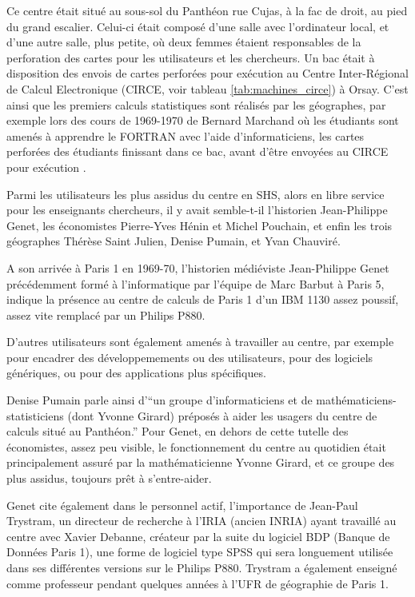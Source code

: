 Ce centre était situé au sous-sol du Panthéon rue Cujas, à la fac de droit, au pied du grand escalier. Celui-ci était composé d'une salle avec l'ordinateur local, et d'une autre salle, plus petite, où deux femmes étaient responsables de la perforation des cartes pour les utilisateurs et les chercheurs. Un bac était à disposition des envois de cartes perforées pour exécution au Centre Inter-Régional de Calcul Electronique (CIRCE, voir tableau \ref{tab:machines_circe}) à Orsay. C'est ainsi que les premiers calculs statistiques sont réalisés par les géographes, par exemple lors des cours de 1969-1970 de Bernard Marchand où les étudiants sont amenés à apprendre le FORTRAN avec l'aide d'informaticiens, les cartes perforées des étudiants finissant dans ce bac, avant d'être envoyées au CIRCE pour exécution \autocite[127]{Cuyala2014}.

Parmi les utilisateurs les plus assidus du centre en SHS, alors en libre service pour les enseignants chercheurs, il y avait semble-t-il l'historien Jean-Philippe Genet, les économistes Pierre-Yves Hénin et Michel Pouchain, et enfin les trois géographes Thérèse Saint Julien, Denise Pumain, et Yvan Chauviré.

A son arrivée à Paris 1 en 1969-70, l'historien médiéviste Jean-Philippe Genet précédemment formé à l'informatique par l'équipe de Marc Barbut à Paris 5, indique la présence au centre de calculs de Paris 1 d'un IBM 1130 assez poussif, assez vite remplacé par un Philips P880.

D'autres utilisateurs sont également amenés à travailler au centre, par exemple pour encadrer des développemements ou des utilisateurs, pour des logiciels génériques, ou pour des applications plus spécifiques.

Denise Pumain parle ainsi d'\enquote{un groupe d'informaticiens et de mathématiciens-statisticiens (dont Yvonne Girard) préposés à aider les usagers du centre de calculs situé au Panthéon.} Pour Genet, en dehors de cette tutelle des économistes, assez peu visible, le fonctionnement du centre au quotidien était principalement assuré par la mathématicienne Yvonne Girard, et ce groupe des plus assidus, toujours prêt à s'entre-aider.

Genet cite également dans le personnel actif, l'importance de Jean-Paul Trystram, un directeur de recherche à l'IRIA (ancien INRIA) ayant travaillé au centre avec Xavier Debanne, créateur par la suite du logiciel BDP (Banque de Données Paris 1), une forme de logiciel type SPSS qui sera longuement utilisée dans ses différentes versions sur le Philips P880. Trystram a également enseigné comme professeur pendant quelques années à l'UFR de géographie de Paris 1.


